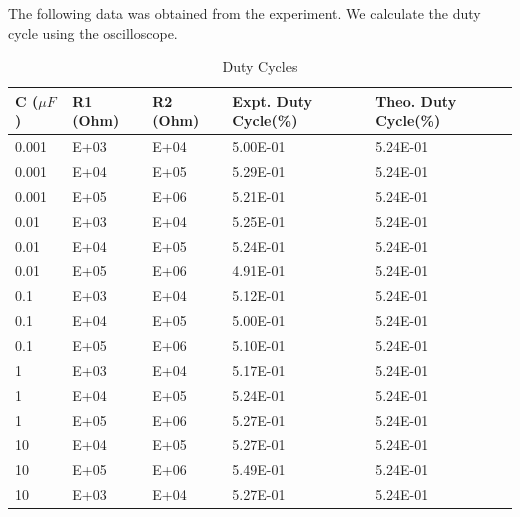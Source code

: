 \documentclass{scrartcl}
\newcommand{\1}{\mathbbm{1}}
\begin{document}
The following data was obtained from the experiment. We calculate the duty cycle using the oscilloscope.
\begin{table}[H]
    \centering
    \begin{tabular}{|l|l|l|l|l|}
    \hline
        \textbf{C ($\mu F$)} & \textbf{R1 (Ohm)} & \textbf{R2 (Ohm)} & \textbf{Expt. Duty Cycle(\%)} & \textbf{Theo. Duty Cycle(\%)}\\ \hline
        0.001 & \num{E+03} & \num{E+04}  & \num{5.00E-01} & \num{5.24E-01}            \\
        0.001 & \num{E+04} & \num{E+05}  & \num{5.29E-01} & \num{5.24E-01}            \\
        0.001 & \num{E+05} & \num{E+06}  & \num{5.21E-01} & \num{5.24E-01}            \\ \hline
        0.01  & \num{E+03} & \num{E+04}   & \num{5.25E-01} & \num{5.24E-01}           \\
        0.01  & \num{E+04} & \num{E+05}   & \num{5.24E-01} & \num{5.24E-01}           \\
        0.01  & \num{E+05} & \num{E+06}   & \num{4.91E-01} & \num{5.24E-01}           \\ \hline
        0.1   & \num{E+03} & \num{E+04}    & \num{5.12E-01} & \num{5.24E-01}          \\
        0.1   & \num{E+04} & \num{E+05}    & \num{5.00E-01} & \num{5.24E-01}          \\
        0.1   & \num{E+05} & \num{E+06}    & \num{5.10E-01} & \num{5.24E-01}          \\ \hline
        1     & \num{E+03} & \num{E+04}      & \num{5.17E-01} & \num{5.24E-01}        \\
        1     & \num{E+04} & \num{E+05}      & \num{5.24E-01} & \num{5.24E-01}        \\
        1     & \num{E+05} & \num{E+06}      & \num{5.27E-01} & \num{5.24E-01}        \\ \hline
        10    & \num{E+04} & \num{E+05}     & \num{5.27E-01} & \num{5.24E-01}         \\
        10    & \num{E+05} & \num{E+06}     & \num{5.49E-01} & \num{5.24E-01}         \\
        10    & \num{E+03} & \num{E+04}  & \num{5.27E-01} & \num{5.24E-01}      \\\hline
    \end{tabular}
    \caption{Duty Cycles}
\end{table}
\end{document}
